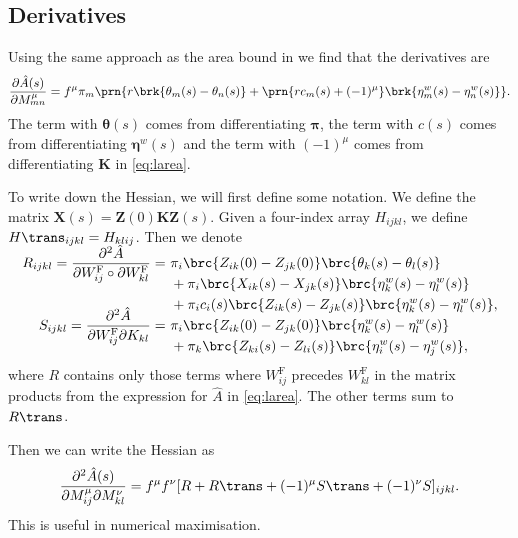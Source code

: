 \documentclass[12pt]{article}
\newcommand{\eqm}{\pi}
\newcommand{\eq}{\boldsymbol{\eqm}}
\newcommand{\fundm}{Z}
\newcommand{\fund}{\mathbf{\fundm}}
\newcommand{\etwm}{\eta^w}
\newcommand{\etw}{\boldsymbol{\eta}^w}
\newcommand{\thbm}{\theta}
\newcommand{\thb}{\boldsymbol{\thbm}}
\newcommand{\Wm}{W}
\newcommand{\MMdm}{M}
\newcommand{\encm}{K}
\newcommand{\enc}{\mathbf{\encm}}
\newcommand{\frgm}{\Wm^{\mathrm{F}}}
\renewcommand{\pdiff}[2]{\frac{\partial #1}{\partial #2}}
\begin{document}

\subsection{Derivatives}\label{sec:lderiv}

Using the same approach as the area bound in \cite{Lahiri2013synapse} we find that the derivatives are
%
\begin{equation}\label{eq:lAdiff}
  \pdiff{\hat{A}(s)}{\MMdm^\mu_{mn}}
     = f^\mu \eqm_m \prn{ r \brk{\thbm_m(s) - \thbm_n(s)}
     +\prn{r {c}_m(s) + (-1)^\mu} \brk{\etwm_m(s) - \etwm_n(s)} }.
\end{equation}
%
The term with \(\thb(s)\) comes from differentiating \(\eq\), the term with \(c(s)\) comes from differentiating \(\etw(s)\) and the term with \((-1)^\mu\) comes from differentiating \(\enc\) in \eqref{eq:larea}.

To write down the Hessian, we will first define some notation.
We define the matrix \(\mathbf{X}(s) = \fund(0) \enc \fund(s)\).
Given a four-index array \(H_{ijkl}\), we define \(H\trans_{ijkl} = H_{klij}\).
Then we denote
%
\begin{equation}\label{eq:hessparts}
\begin{alignedat}{3}
    R_{ijkl} = \smash{\pdiff{^2 \hat{A}}{\frgm_{ij} \circ \partial \frgm_{kl}}} 
    &= \
    &&\eqm_i \brc{\fundm_{ik}(0) - \fundm_{jk}(0)} \brc{\thbm_k(s) - \thbm_l(s)} \\
    &&&+ \eqm_i \brc{{X}_{ik}(s) - {X}_{jk}(s)} 
          \brc{\etwm_k(s) - \etwm_l(s)} \\
    &&&+ \eqm_i {c}_i(s) \brc{\fundm_{ik}(s) - \fundm_{jk}(s)} 
          \brc{\etwm_k(s) - \etwm_l(s)},  \\
  S_{ijkl} = \smash{\pdiff{^2 \hat{A}}{\frgm_{ij} \partial \encm_{kl}} }
  &= \
    &&\eqm_i \brc{\fundm_{ik}(0) - \fundm_{jk}(0)} \brc{\etwm_k(s) - \etwm_l(s)} \\
    &&&+ \eqm_k \brc{\fundm_{ki}(s) - \fundm_{li}(s)} \brc{\etwm_i(s) - \etwm_j(s)},
\end{alignedat}
\end{equation}
%
where \(R\) contains only those terms where \( \frgm_{ij} \) precedes \( \frgm_{kl} \) in the matrix products from the expression for \( \hat{A} \) in \cref{eq:larea}.
The other terms sum to \(R\trans\).

Then we can write the Hessian as
%
\begin{equation}\label{eq:hessian}
  \pdiff{^2\hat{A}(s)}{\MMdm^\mu_{ij} \partial \MMdm^\nu_{kl}} =
     f^\mu f^\nu [R + R\trans + (-1)^\mu S\trans + (-1)^\nu S]_{ijkl}.
\end{equation}
%
This is useful in numerical maximisation.
\end{document}
